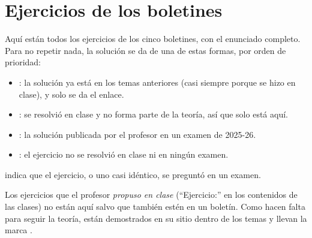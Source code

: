 \section{Ejercicios de los boletines}

Aquí están todos los ejercicios de los cinco boletines, con el enunciado completo. Para no repetir nada, la solución se da de una de estas formas, por orden de prioridad:
\begin{itemize}
    \item {}: la solución ya está en los temas anteriores (casi siempre porque se hizo en clase), y solo se da el enlace.
    \item {}: se resolvió en clase y no forma parte de la teoría, así que solo está aquí.
    \item \fuenteexamen{\dots}: la solución publicada por el profesor en un examen de 2025-26.
    \item \fuentepropia: el ejercicio no se resolvió en clase ni en ningún examen.
\end{itemize}
\enexamen{\dots} indica que el ejercicio, o uno casi idéntico, se preguntó en un examen.

Los ejercicios que el profesor \emph{propuso en clase} (``Ejercicio:'' en los contenidos de las clases) no están aquí salvo que también estén en un boletín. Como hacen falta para seguir la teoría, están demostrados en su sitio dentro de los temas y llevan la marca \marcaE.






